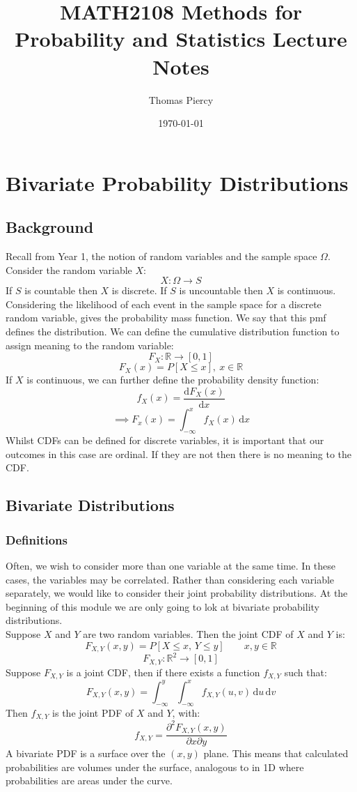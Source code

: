 \documentclass[12pt]{article}
\title{\textbf{MATH2108 Methods for Probability and Statistics Lecture Notes}}
\author{Thomas Piercy}
\date{\today{}}
\newcommand{\df}[2]{\frac{\text{d}#1}{\text{d}#2}}
\newcommand{\pf}[2]{\frac{\partial #1}{\partial #2}}
\begin{document}
\maketitle
\hrulefill
\tableofcontents
\newpage
{}
\section{Bivariate Probability Distributions}
\subsection{Background}
Recall from Year 1, the notion of random variables and the sample space \(\Omega\). Consider the random variable \(X\):
\[X:\Omega\to S\]
If \(S\) is countable then \(X\) is discrete. If \(S\) is uncountable then \(X\) is continuous. Considering the likelihood of each event in the sample space for a discrete random variable, gives the probability mass function. We say that this pmf defines the distribution. We can define the cumulative distribution function to assign meaning to the random variable:
\[F_X:\mathbb{R}\to[0,1]\]
\[F_X(x)=P[X\leq x],\ x\in\mathbb{R}\]
If \(X\) is continuous, we can further define the probability density function:
\[f_X(x)=\df{F_X(x)}{x}\]
\[\implies F_x(x)=\int^x_{-\infty}f_X(x)\,\text{d}x\]
Whilst CDFs can be defined for discrete variables, it is important that our outcomes in this case are ordinal. If they are not then there is no meaning to the CDF.
\subsection{Bivariate Distributions}
\subsubsection*{Definitions}
Often, we wish to consider more than one variable at the same time. In these cases, the variables may be correlated. Rather than considering each variable separately, we would like to consider their joint probability distributions. At the beginning of this module we are only going to lok at bivariate probability distributions.
\\
Suppose \(X\) and \(Y\) are two random variables. Then the joint CDF of \(X\) and \(Y\) is:
\[F_{X,Y}(x,y)=P[X\leq x,\, Y\leq y]\qquad x,y\in\mathbb{R}\]
\[F_{X,Y}:\mathbb{R}^2\to [0,1]\]
Suppose \(F_{X,Y}\) is a joint CDF, then if there exists a function \(f_{X,Y}\) such that:
\[F_{X,Y}(x,y)=\int^y_{-\infty}\int^x_{-\infty}f_{X,Y}(u,v)\,\text{d}u\,\text{d}v\]
Then \(f_{X,Y}\) is the joint PDF of \(X\) and \(Y\), with:
\[f_{X,Y}=\pf{^2F_{X,Y}(x,y)}{x\partial y}\]
A bivariate PDF is a surface over the \((x,y)\) plane. This means that calculated probabilities are volumes under the surface, analogous to in 1D where probabilities are areas under the curve.
\end{document}
